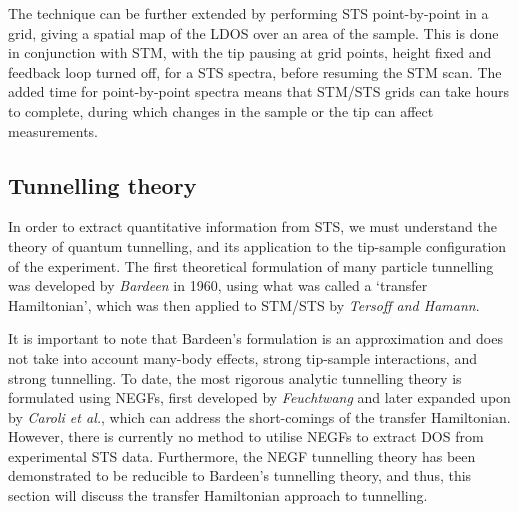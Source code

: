 \begin{figure} [h]
    \centering
    \caption{}
    \label{fig:exptech:stsldos}
\end{figure}

The technique can be further extended by performing \ac{STS} point-by-point in a grid, giving a spatial map of the \ac{LDOS} over an area of the sample. This is done in conjunction with \ac{STM}, with the tip pausing at grid points, height fixed and feedback loop turned off, for a \ac{STS} spectra, before resuming the \ac{STM} scan. The added time for point-by-point spectra means that \ac{STM}/\ac{STS} grids can take hours to complete, during which changes in the sample or the tip can affect measurements. 


\subsection{Tunnelling theory}
In order to extract quantitative information from \ac{STS}, we must understand the theory of quantum tunnelling, and its application to the tip-sample configuration of the experiment. The first theoretical formulation of many particle tunnelling was developed by \textit{Bardeen} in 1960, using what was called a `transfer Hamiltonian', which was then applied to \ac{STM}/\ac{STS} by \textit{Tersoff and Hamann}. 

It is important to note that Bardeen's formulation is an approximation and does not take into account many-body effects, strong tip-sample interactions, and strong tunnelling. To date, the most rigorous analytic tunnelling theory is formulated using \acp{NEGF}, first developed by \textit{Feuchtwang} and later expanded upon by \textit{Caroli et al.}, which can address the short-comings of the transfer Hamiltonian. However, there is currently no method to utilise \acp{NEGF} to extract \ac{DOS} from experimental \ac{STS} data. Furthermore, the \ac{NEGF} tunnelling theory has been demonstrated to be reducible to Bardeen's tunnelling theory, and thus, this section will discuss the transfer Hamiltonian approach to tunnelling.

